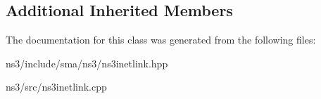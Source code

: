 \subsection*{Additional Inherited Members}


The documentation for this class was generated from the following files\-:\begin{DoxyCompactItemize}
\item 
ns3/include/sma/ns3/ns3inetlink.\-hpp\item 
ns3/src/ns3inetlink.\-cpp\end{DoxyCompactItemize}
